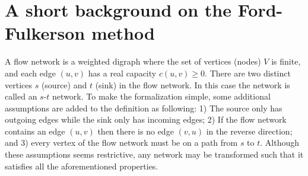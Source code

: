 \documentclass{llncs}
\begin{document}
\section{A short background on the Ford-Fulkerson method}
%       
%   
% 
%         
%   
%   
%   
%   
%   
A flow network is a weighted digraph where the set of vertices (nodes) $V$ is finite, and each edge $(u, v)$ has a real capacity $c (u, v) \geq 0$. There are two distinct vertices $s$ (source) and $t$ (sink) in the flow network. In this case the network is called an $s$-$t$ network. To make the formalization simple, some additional assumptions are added to the definition as following: 1) The source only has outgoing edges while the sink only has incoming edges; 2) If the flow network contains an edge $(u, v)$ then there is no edge $(v, u)$ in the reverse direction; and 3) every vertex of the flow network must be on a path from $s$ to $t$. Although these assumptions seems restrictive, any network may be transformed such that it satisfies all the aforementioned properties.
\end{document}
